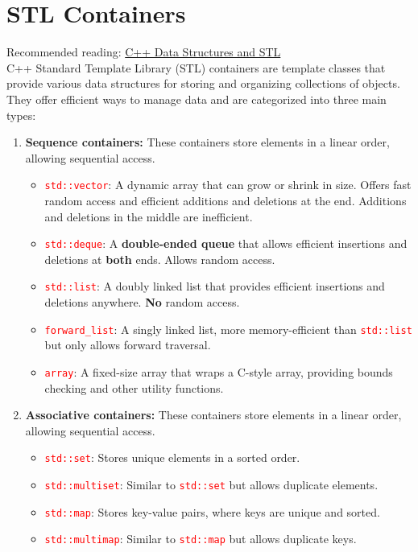 \documentclass[12pt]{article}
\begin{document}
\tableofcontents

\newpage
{}
\part*{\centering STL Containers}

\noindent Recommended reading: \href{https://www.w3schools.com/cpp/cpp_data_structures.asp}{C++ Data Structures and STL} \\

\noindent C++ Standard Template Library (STL) containers are template classes that provide various data structures for storing and organizing collections of objects. They offer efficient ways to manage 
data and are categorized into three main types:

\begin{enumerate}
    \item \textbf{Sequence containers:} These containers store elements in a linear order, allowing sequential access.
    
    \begin{itemize}
        \item \textcolor{red}{\texttt{std::vector}}: A dynamic array that can grow or shrink in size. Offers fast random access and efficient additions and deletions at the end. Additions 
        and deletions in the middle are inefficient.
        \item \textcolor{red}{\texttt{std::deque}}: A \textbf{double-ended queue} that allows efficient insertions and deletions at \textbf{both} ends. Allows random access.
        \item \textcolor{red}{\texttt{std::list}}: A doubly linked list that provides efficient insertions and deletions anywhere. \textbf{No} random access.
        \item \textcolor{red}{\texttt{forward\_list}}: A singly linked list, more memory-efficient than \textcolor{red}{\texttt{std::list}} but only allows forward traversal.
        \item \textcolor{red}{\texttt{array}}: A fixed-size array that wraps a C-style array, providing bounds checking and other utility functions.
    \end{itemize}

    \item \textbf{Associative containers:} These containers store elements in a linear order, allowing sequential access.

    \begin{itemize}
        \item \textcolor{red}{\texttt{std::set}}: Stores unique elements in a sorted order.
        \item \textcolor{red}{\texttt{std::multiset}}: Similar to \textcolor{red}{\texttt{std::set}} but allows duplicate elements.
        \item \textcolor{red}{\texttt{std::map}}: Stores key-value pairs, where keys are unique and sorted.
        \item \textcolor{red}{\texttt{std::multimap}}: Similar to \textcolor{red}{\texttt{std::map}} but allows duplicate keys.
    \end{itemize}


\end{enumerate}
\end{document}
